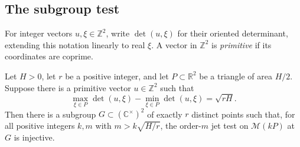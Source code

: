 \subsection{The subgroup test}

For integer vectors $u,\xi\in\mathbb{Z}^2$, write $\det(u,\xi)$ for their oriented determinant, extending this notation linearly to real $\xi$. A vector in $\mathbb{Z}^2$ is \emph{primitive} if its coordinates are coprime.

\begin{proposition}\label{prop:subgroup-test}
Let $H>0$, let $r$ be a positive integer, and let $P\subset\mathbb{R}^2$ be a triangle of area $H/2$.  Suppose there is a primitive vector $u\in\mathbb{Z}^2$ such that
\[
 \max_{\xi\in P}\det(u,\xi)
 -\min_{\xi\in P}\det(u,\xi)=\sqrt{rH}.
\]
Then there is a subgroup $G\subset(\mathbb{C}^\times)^2$ of exactly $r$ distinct points such that, for all positive integers $k,m$ with $m>k\sqrt{H/r}$, the order-$m$ jet test on $\mathcal{M}(kP)$ at $G$ is injective.
\end{proposition}


